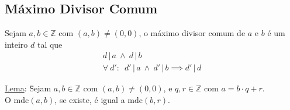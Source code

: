 \documentclass{article}
\begin{document}
\subsection{Máximo Divisor Comum}
Sejam $a, b \in \mathbb{Z}$ com $(a, b) \neq (0, 0)$, o máximo divisor comum de $a$ e $b$ é um inteiro $d$ tal que
\begin{gather*}
  d \,|\, a \> \land \> d \,|\, b \\[5pt]
  \forall \> d': \enspace d' \,|\, a \> \land \> d' \,|\, b \implies d' \,|\, d
\end{gather*}
\vspace{-10pt}
\begin{tabbing}
  \uline{Lema}: \= Sejam $a, b \in \mathbb{Z}$ com $(a,b) \neq (0,0)$, e $q, r \in \mathbb{Z}$ com $a = b \cdot q + r$. \\[5pt]
  \> O $\text{mdc}(a,b)$, se existe, é igual a $\text{mdc}(b, r)$.
\end{tabbing}
\end{document}
